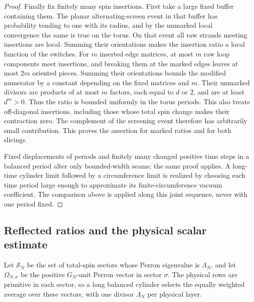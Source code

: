 \begin{proof}
Finally fix finitely many spin insertions. First take a large fixed
buffer containing them. The planar alternating-screen event in that
buffer has probability tending to one with its radius, and by the
unmarked local convergence the same is true on the torus. On that
event all raw strands meeting insertions are local. Summing their
orientations makes the insertion ratio a local function of the
switches. For \(m\) inserted edge matrices, at most \(m\) raw loop
components meet insertions, and breaking them at the marked edges
leaves at most \(2m\) oriented pieces. Summing their orientations
bounds the modified numerator by a constant depending on the fixed
matrices and \(m\). Their unmarked divisors are products of at
most \(m\) factors, each equal to \(d\) or \(2\), and are at
least \(d^m>0\). Thus the ratio is bounded uniformly in the torus
periods. This also treats off-diagonal insertions, including those
whose total spin change makes their contraction zero. The complement
of the screening event therefore has
arbitrarily small contribution. This proves the assertion for marked
ratios and for both slicings.

Fixed displacements of periods and finitely many changed positive
time steps in a balanced period alter only bounded-width seams;
the same proof applies. A long-time cylinder limit followed by a
circumference limit is realized by choosing each time period large
enough to approximate its finite-circumference vacuum coefficient.
The comparison above is applied along this joint sequence, never
with one period fixed.
\end{proof}

\subsection{Reflected ratios and the physical scalar estimate}

Let \(\mathcal S_N\) be the set of total-spin sectors whose Perron
eigenvalue is \(\Lambda_N\), and let \(\Omega_{N,\sigma}\) be the positive
\(G_N\)-unit Perron vector in sector \(\sigma\).  The physical rows are
primitive in each sector, so a long balanced cylinder selects the equally
weighted average over these vectors, with one divisor \(\Lambda_N\) per
physical layer.

